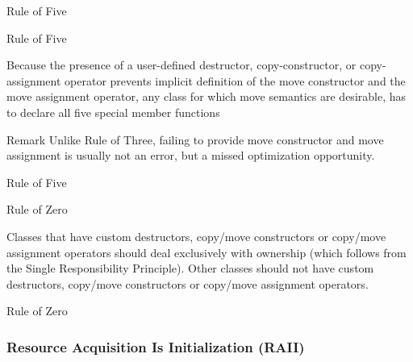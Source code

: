 \begin{frame}{Rule of Five}{}
  \begin{example}
  \end{example}
\end{frame}

\begin{frame}{Rule of Five}{}
  \begin{definition}
    Because the presence of a user-defined destructor, copy-constructor, or copy-assignment operator prevents implicit definition of the move constructor and the move assignment operator, any class for which move semantics are desirable, has to declare all five special member functions
  \end{definition}

  \begin{block}{Remark}
    Unlike Rule of Three, failing to provide move constructor and move assignment is usually not an error, but a missed optimization opportunity.
  \end{block}
\end{frame}

\begin{frame}{Rule of Five}{}
  \begin{example}
  \end{example}
\end{frame}

\begin{frame}{Rule of Zero}{}
  \begin{definition}
    Classes that have custom destructors, copy/move constructors or copy/move assignment operators should deal exclusively with ownership (which follows from the Single Responsibility Principle). Other classes should not have custom destructors, copy/move constructors or copy/move assignment operators.
  \end{definition}
\end{frame}

\begin{frame}{Rule of Zero}{}
  \begin{example}
  \end{example}
\end{frame}

\subsubsection{Resource Acquisition Is Initialization (RAII)}

